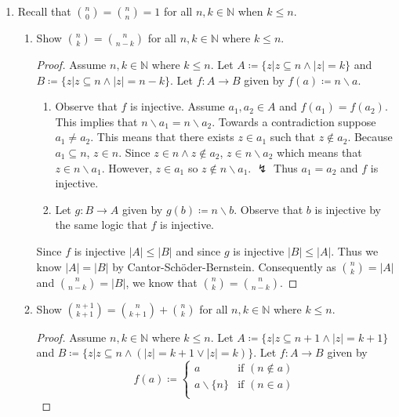 \documentclass{article}
\newcommand{\defeq}{\coloneqq}
\newcommand{\naturals}{\mathbb{N}}
\begin{document}
\begin{enumerate}
  \item
    Recall that $\binom{n}{0} = \binom{n}{n} = 1$ for all $n, k \in \naturals$ when $k \leq n$.
    \begin{enumerate}
      \item
        Show $\binom{n}{k} = \binom{n}{n - k}$ for all $n, k \in \naturals$ where $k \leq n$.
        \begin{proof}
            Assume $n, k \in \naturals$ where $k \leq n$. Let $A \defeq \{z|z \subseteq n \land |z|=k\}$ and $B \defeq \{z|z \subseteq n \land |z|=n-k\}$. Let $f: A \to B$ given by $f(a) \defeq n \backslash a$.
            \begin{enumerate}
                \item [] Observe that $f$ is injective. Assume $a_1,a_2 \in A$ and $f(a_1)=f(a_2)$. This implies that $n \backslash a_1=n \backslash a_2$. Towards a contradiction suppose $a_1 \neq a_2$. This means that there exists $z \in a_1$ such that $z \notin a_2$. Because $a_1\subseteq n$, $z\in n$. Since $z\in n \land z \notin a_2$, $z \in n \backslash a_2$ which means that $z \in n \backslash a_1$. However, $z \in a_1$ so $z \notin n \backslash a_1$. $\lightning$
                Thus $a_1= a_2$ and $f$ is injective.
                \item []Let $g: B \to A$ given by $g(b) \defeq n \backslash b$. Observe that $b$ is injective by the same logic that $f$ is injective.    
            \end{enumerate}
            Since $f$ is injective $|A|\leq|B|$ and since $g$ is injective $|B|\leq|A|$. Thus we know $|A|=|B|$ by Cantor-Schöder-Bernstein. Consequently as $\binom{n}{k}=|A|$ and $\binom{n}{n-k}=|B|$, we know that $\binom{n}{k} = \binom{n}{n - k}$.
        \end{proof}
\pagebreak
      \item
        Show $\binom{n + 1}{k + 1} = \binom{n}{k + 1} + \binom{n}{k}$ for all $n, k \in \naturals$ where $k \leq n$.
        \begin{proof}
            Assume $n, k \in \naturals$ where $k \leq n$. Let $A \defeq \{z|z \subseteq n+1 \land |z|=k+1\}$ and $B \defeq \{z|z \subseteq n \land (|z|=k+1\lor |z| = k)\}$. Let $f: A \to B$ given by 
            \[f(a) \defeq
            \begin{cases}
                a & \text{if } (n \notin a)\\
                a \backslash \{n\} & \text{if } (n \in a)\\

\end{cases}\]
\end{proof}
\end{enumerate}
\end{enumerate}
\end{document}

